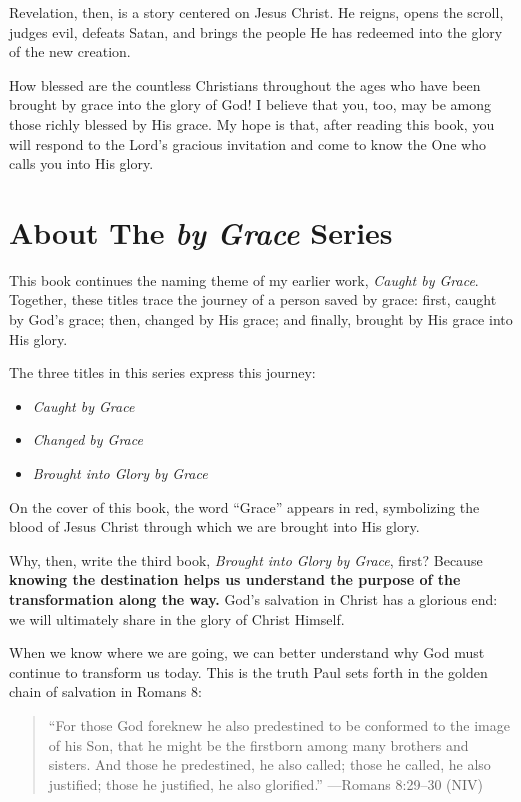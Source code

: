 Revelation, then, is a story centered on Jesus Christ. He reigns, opens the scroll, judges evil, defeats Satan, and brings the people He has redeemed into the glory of the new creation.

How blessed are the countless Christians throughout the ages who have been brought by grace into the glory of God! I believe that you, too, may be among those richly blessed by His grace. My hope is that, after reading this book, you will respond to the Lord's gracious invitation and come to know the One who calls you into His glory.

\section*{About The \textit{by Grace} Series}

This book continues the naming theme of my earlier work, \textit{Caught by Grace}. Together, these titles trace the journey of a person saved by grace: first, caught by God's grace; then, changed by His grace; and finally, brought by His grace into His glory.

The three titles in this series express this journey:

\begin{itemize}
    \item \textit{Caught by Grace}
    \item \textit{Changed by Grace}
    \item \textit{Brought into Glory by Grace }
\end{itemize}

On the cover of this book, the word ``Grace'' appears in red, symbolizing the blood of Jesus Christ through which we are brought into His glory.

Why, then, write the third book, \textit{Brought into Glory by Grace}, first? Because \textbf{knowing the destination helps us understand the purpose of the transformation along the way.} God's salvation in Christ has a glorious end: we will ultimately share in the glory of Christ Himself.

When we know where we are going, we can better understand why God must continue to transform us today. This is the truth Paul sets forth in the golden chain of salvation in Romans 8:

\begin{quote}
``For those God foreknew he also predestined to be conformed to the image of his Son, that he might be the firstborn among many brothers and sisters. And those he predestined, he also called; those he called, he also justified; those he justified, he also glorified.''
---Romans 8:29--30 (NIV)
\end{quote}

